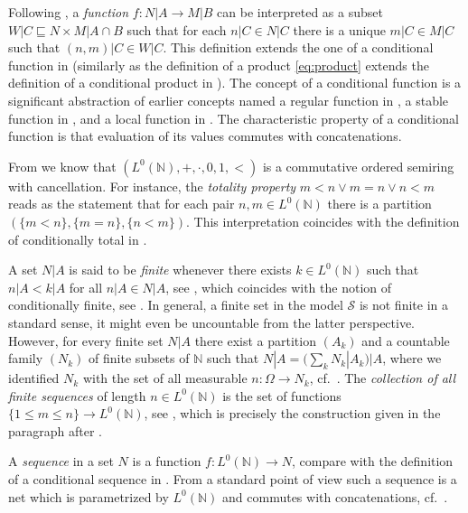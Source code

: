 \documentclass{jloganal}
\numberwithin{equation}{section}
\theoremstyle{plain}
\renewcommand{\leq}{\leqslant}
\newcommand\N{\mathbb{N}}
\begin{document}
Following \cite[Definition II.3.1]{simpson2009subsystems}, a \emph{function} $f\colon N|A\to M|B$ can be interpreted as a subset $W|C \sqsubseteq N\times M|A\cap B$ such that for each $n|C\in N|C$ there is a unique $m|C\in M|C$ such that $(n,m)|C\in W|C$.  
This definition extends the one of a conditional function in \cite[Definition 2.17]{drapeau2016algebra} (similarly as the definition of a product \eqref{eq:product} extends the definition of a conditional product in \cite{drapeau2016algebra}). 
The concept of a conditional function is a significant abstraction of earlier concepts named a regular function in \cite[Definition 4, Proposition 1]{detlefsen2005conditional}, a stable function in \cite[Definition 4.2]{cheridito2015conditional}, and a local function in \cite[Definition 3.1]{filipovic2009separation}. 
The characteristic property of a conditional function is that evaluation of its values commutes with concatenations.  

From \cite[Lemma II.2.1]{simpson2009subsystems} we know that $(L^{0}(\mathbb{N}),+,\cdot,0,1,<)$ is a commutative ordered semiring with cancellation.  
For instance, the \emph{totality property} $m<n \vee m=n \vee n<m$ reads as the statement that for each pair $n,m\in L^0(\N)$ there is a partition $(\{m<n\},\{m=n\}, \{n<m\})$. 
This interpretation coincides with the definition of conditionally total in \cite[Definition 2.15]{drapeau2016algebra}. 

A set $N|A$ is said to be \emph{finite} whenever there exists $k\in L^0(\N)$ such that $n|A<k|A$ for all $n|A\in N|A$, see \cite[p.~67]{simpson2009subsystems}, which coincides with the notion of conditionally finite, see \cite[Definition 2.23]{drapeau2016algebra}.  In general, a finite set in the model  $ \mathcal{S} $ is not finite in a standard sense, it might even be uncountable from the latter perspective. However, for every finite set $N|A$ there exist a partition $(A_k)$ and a countable family $(N_k)$ of finite subsets of $\mathbb{N}$ such that $N|A=(\sum_k N_k|A_k)|A$, where we identified $N_k$ with the set of all measurable $n\colon \Omega\to N_k$, cf.~\cite[Lemma 2.22]{drapeau2016algebra}. 
The \emph{collection of all finite sequences} of length $n\in L^0(\N)$ is the set of functions $\{1\leq m\leq n\}\to L^0(\N)$, see \cite[Definition II.3.3]{simpson2009subsystems}, which is precisely the construction given in the paragraph after \cite[Definition 2.20]{drapeau2016algebra}.  

A \emph{sequence} in a set $N$ is a function $f\colon L^0(\N)\to N$, compare with the definition of a conditional sequence in \cite[Example 2.2.1]{drapeau2016algebra}.  
From a standard point of view such a sequence is a net which is parametrized by $L^0(\N)$ and commutes with concatenations,  cf.~\cite[Section 2]{drapeau2017fenchel}. 
\end{document}
